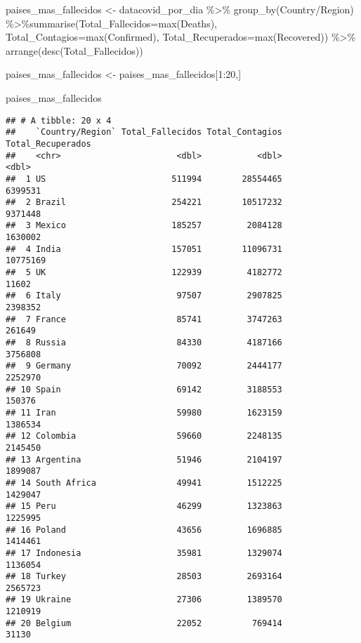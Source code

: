 \documentclass[
]{book}
\newenvironment{Shaded}{\begin{snugshade}}{\end{snugshade}}
\newcommand{\AttributeTok}[1]{\textcolor[rgb]{0.77,0.63,0.00}{#1}}
\newcommand{\DecValTok}[1]{\textcolor[rgb]{0.00,0.00,0.81}{#1}}
\newcommand{\FunctionTok}[1]{\textcolor[rgb]{0.00,0.00,0.00}{#1}}
\newcommand{\NormalTok}[1]{#1}
\newcommand{\OtherTok}[1]{\textcolor[rgb]{0.56,0.35,0.01}{#1}}
\newcommand{\SpecialCharTok}[1]{\textcolor[rgb]{0.00,0.00,0.00}{#1}}
\newcommand{\StringTok}[1]{\textcolor[rgb]{0.31,0.60,0.02}{#1}}
\begin{document}
\begin{Shaded}
\begin{Highlighting}[]
\NormalTok{paises\_mas\_fallecidos }\OtherTok{\textless{}{-}}\NormalTok{ datacovid\_por\_dia }\SpecialCharTok{\%\textgreater{}\%} \FunctionTok{group\_by}\NormalTok{(}\StringTok{\textasciigrave{}}\AttributeTok{Country/Region}\StringTok{\textasciigrave{}}\NormalTok{) }\SpecialCharTok{\%\textgreater{}\%}\FunctionTok{summarise}\NormalTok{(}\AttributeTok{Total\_Fallecidos=}\FunctionTok{max}\NormalTok{(Deaths), }\AttributeTok{Total\_Contagios=}\FunctionTok{max}\NormalTok{(Confirmed), }\AttributeTok{Total\_Recuperados=}\FunctionTok{max}\NormalTok{(Recovered)) }\SpecialCharTok{\%\textgreater{}\%} \FunctionTok{arrange}\NormalTok{(}\FunctionTok{desc}\NormalTok{(Total\_Fallecidos))}

\NormalTok{paises\_mas\_fallecidos }\OtherTok{\textless{}{-}}\NormalTok{ paises\_mas\_fallecidos[}\DecValTok{1}\SpecialCharTok{:}\DecValTok{20}\NormalTok{,]}

\NormalTok{paises\_mas\_fallecidos}
\end{Highlighting}
\end{Shaded}

\begin{verbatim}
## # A tibble: 20 x 4
##    `Country/Region` Total_Fallecidos Total_Contagios Total_Recuperados
##    <chr>                       <dbl>           <dbl>             <dbl>
##  1 US                         511994        28554465           6399531
##  2 Brazil                     254221        10517232           9371448
##  3 Mexico                     185257         2084128           1630002
##  4 India                      157051        11096731          10775169
##  5 UK                         122939         4182772             11602
##  6 Italy                       97507         2907825           2398352
##  7 France                      85741         3747263            261649
##  8 Russia                      84330         4187166           3756808
##  9 Germany                     70092         2444177           2252970
## 10 Spain                       69142         3188553            150376
## 11 Iran                        59980         1623159           1386534
## 12 Colombia                    59660         2248135           2145450
## 13 Argentina                   51946         2104197           1899087
## 14 South Africa                49941         1512225           1429047
## 15 Peru                        46299         1323863           1225995
## 16 Poland                      43656         1696885           1414461
## 17 Indonesia                   35981         1329074           1136054
## 18 Turkey                      28503         2693164           2565723
## 19 Ukraine                     27306         1389570           1210919
## 20 Belgium                     22052          769414             31130
\end{verbatim}
\end{document}
